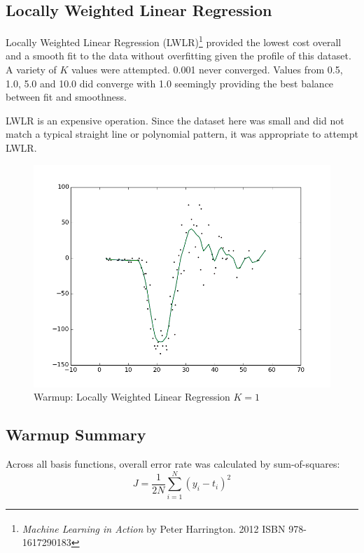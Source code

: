 \documentclass[11pt, oneside]{article}   	%
\begin{document}
\subsection*{Locally Weighted Linear Regression}

Locally Weighted Linear Regression (LWLR)\footnote{\emph{Machine Learning in Action} by Peter Harrington. \textsuperscript{\textcopyright} 2012 ISBN 978-1617290183} provided the lowest cost overall and a smooth fit to the data without overfitting given the profile of this dataset. A variety of $K$ values were attempted. 0.001 never converged. Values from 0.5, 1.0, 5.0 and 10.0 did converge with 1.0 seemingly providing the best balance between fit and smoothness.

LWLR is an expensive operation. Since the dataset here was small and did not match a typical straight line or polynomial pattern, it was appropriate to attempt LWLR.





\begin{figure}[h!] 
\centering
\includegraphics[scale=0.6]{lwlr}
\caption{Warmup: Locally Weighted Linear Regression $K=1$}
\end{figure}

\subsection*{Warmup Summary}
Across all basis functions, overall error rate was calculated by sum-of-squares:
\begin{equation}
J = \frac{1}{2N}\sum_{i=1}^N(y_i-t_i)^2
\end{equation}
\end{document}
